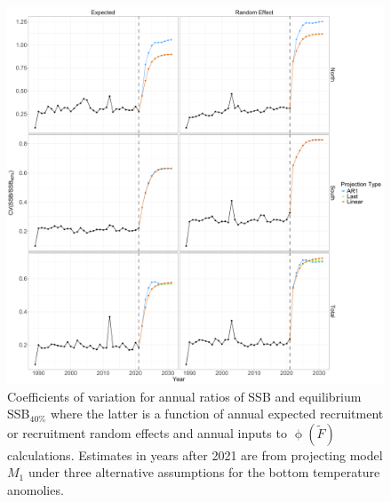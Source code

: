 \documentclass[
]{article}
\begin{document}
\begin{figure}

{\centering \includegraphics[height=0.95\textheight]{proj_SSB_status_CV} 

}

\caption{Coefficients of variation for annual ratios of SSB and equilibrium SSB$_{40\%}$ where the latter is a function of annual expected recruitment or recruitment random effects and annual inputs to $\upphi(\widetilde{F})$ calculations. Estimates in years after 2021 are from projecting model $M_1$ under three alternative assumptions for the bottom temperature anomolies.}\label{fig:annual-SSB-status-cvs}
\end{figure}
\end{document}

